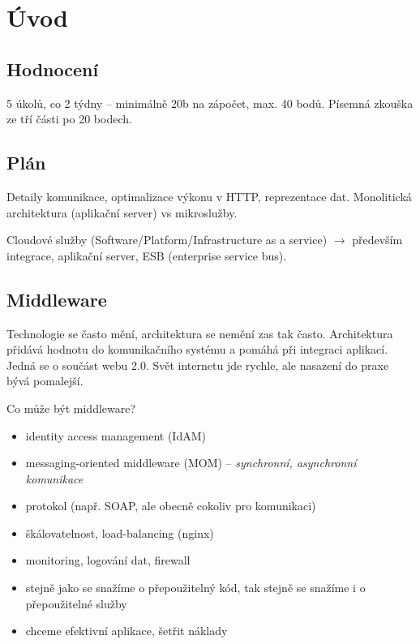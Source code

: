 \section{Úvod}

\vspace{12pt}

\subsection{Hodnocení}

5 úkolů, co 2 týdny -- minimálně 20b na zápočet, max. 40 bodů. Písemná zkouška ze tří části po 20 bodech.

\subsection{Plán}

Detaily komunikace, optimalizace výkonu v HTTP, reprezentace dat. Monolitická architektura (aplikační server) vs mikroslužby.

Cloudové služby (Software/Platform/Infrastructure as a service) $\to$ především integrace, aplikační server, ESB (enterprise service bus).

\subsection{Middleware}

Technologie se často mění, architektura se nemění zas tak často. Architektura přidává hodnotu do komunikačního systému a pomáhá při integraci aplikací. Jedná se o součást webu 2.0. Svět internetu jde rychle, ale nasazení do praxe bývá pomalejší.

\vspace{6pt}

Co může být middleware?

\begin{itemize}
    \item identity access management (IdAM)
    \item messaging-oriented middleware (MOM) -- \textit{synchronní, asynchronní komunikace}
    \item protokol (např. SOAP, ale obecně cokoliv pro komunikaci)
    \item škálovatelnost, load-balancing (nginx)
    \item monitoring, logování dat, firewall
    \item stejně jako se snažíme o přepoužitelný kód, tak stejně se snažíme i o přepoužitelné služby
    \item chceme efektivní aplikace, šetřit náklady
\end{itemize}
